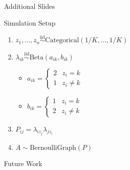 \documentclass[
  ignorenonframetext,
]{beamer}
\providecommand{\tightlist}{%
  \setlength{\itemsep}{0pt}\setlength{\parskip}{0pt}}
\begin{document}
\begin{frame}{Additional Slides}
\protect\hypertarget{additional-slides}{}
\end{frame}

\begin{frame}{Simulation Setup}
\protect\hypertarget{simulation-setup}{}
\begin{enumerate}
\tightlist
\item
  \(z_1, ..., z_n \stackrel{\text{iid}}{\sim}\text{Categorical}(1/K, ..., 1/K)\)
\item
  \(\lambda_{ik} \stackrel{\text{iid}}{\sim}\text{Beta}(a_{ik}, b_{ik})\)

  \begin{itemize}
  \tightlist
  \item
    \(a_{ik} = \begin{cases} 2 & z_i = k \\ 1 & z_i \neq k \end{cases}\)
  \item
    \(b_{ik} = \begin{cases} 1 & z_i = k \\ 2 & z_i \neq k \end{cases}\)
  \end{itemize}
\item
  \(P_{ij} = \lambda_{i z_j} \lambda_{j z_i}\)
\item
  \(A \sim \text{BernoulliGraph}(P)\)
\end{enumerate}
\end{frame}

\begin{frame}{Future Work}
\protect\hypertarget{future-work}{}
\end{frame}
\end{document}
